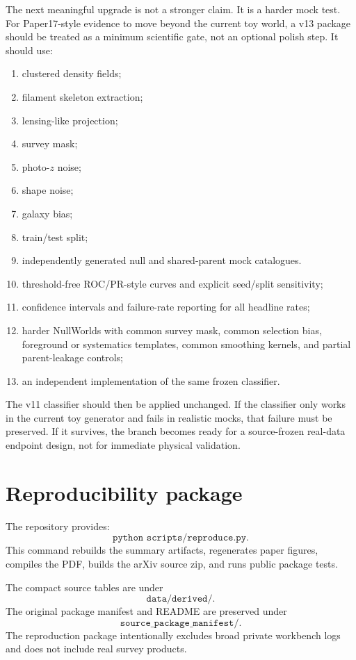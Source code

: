 \documentclass[12pt]{article}
\begin{document}
The next meaningful upgrade is not a stronger claim.  It is a harder mock test.
For Paper17-style evidence to move beyond the current toy world, a v13 package
should be treated as a minimum scientific gate, not an optional polish step.  It
should use:
\begin{enumerate}[leftmargin=1.4em]
\item clustered density fields;
\item filament skeleton extraction;
\item lensing-like projection;
\item survey mask;
\item photo-\(z\) noise;
\item shape noise;
\item galaxy bias;
\item train/test split;
\item independently generated null and shared-parent mock catalogues.
\item threshold-free ROC/PR-style curves and explicit seed/split sensitivity;
\item confidence intervals and failure-rate reporting for all headline rates;
\item harder NullWorlds with common survey mask, common selection bias,
foreground or systematics templates, common smoothing kernels, and partial
parent-leakage controls;
\item an independent implementation of the same frozen classifier.
\end{enumerate}

The v11 classifier should then be applied unchanged.  If the classifier only
works in the current toy generator and fails in realistic mocks, that failure
must be preserved.  If it survives, the branch becomes ready for a
source-frozen real-data endpoint design, not for immediate physical validation.

\section{Reproducibility package}

The repository provides:
\[
  \texttt{python scripts/reproduce.py}.
\]
This command rebuilds the summary artifacts, regenerates paper figures,
compiles the PDF, builds the arXiv source zip, and runs public package tests.

The compact source tables are under
\[
  \texttt{data/derived/}.
\]
The original package manifest and README are preserved under
\[
  \texttt{source\_package\_manifest/}.
\]
The reproduction package intentionally excludes broad private workbench logs and
does not include real survey products.
\end{document}
